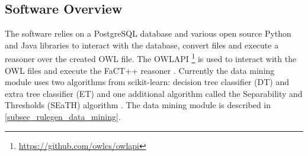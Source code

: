 \documentclass[authoryear, review,12pt,number]{elsarticle}
\begin{document}
\subsection{Software Overview}
\label{subsec_software}
The software relies on a PostgreSQL database and various open source Python and 
Java libraries to interact with the database, convert files and execute a 
reasoner over the created OWL file.
The OWLAPI \footnote{\url{https://github.com/owlcs/owlapi}} is used to interact 
with the OWL files and execute the FaCT++
reasoner \citep{Tsarkov2006}. Currently the data mining module uses two 
algorithms from scikit-learn: decision tree classifier (DT) and extra tree 
classifier (ET) and one additional algorithm called the Separability and 
Thresholds (SEaTH) algorithm \citep{Nussbaum2006}. The data mining module is 
described in \ref{subsec_rulegen_data_mining}. 
\end{document}
